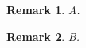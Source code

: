\documentclass{article}
\newtheorem{rem}{Remark}
\begin{document}
\begin{rem}A.\end{rem}
\begin{rem}B.\end{rem}
\end{document}
